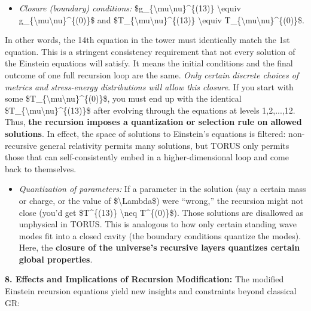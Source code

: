 \documentclass[
]{article}
\begin{document}
\begin{itemize}
\item
  \emph{Closure (boundary) conditions:}
  \$g\_\{\textbackslash mu\textbackslash nu\}\^{}\{(13)\}
  \textbackslash equiv
  g\_\{\textbackslash mu\textbackslash nu\}\^{}\{(0)\}\$ and
  \$T\_\{\textbackslash mu\textbackslash nu\}\^{}\{(13)\}
  \textbackslash equiv
  T\_\{\textbackslash mu\textbackslash nu\}\^{}\{(0)\}\$\hspace{0pt}.
\end{itemize}

In other words, the 14th equation in the tower must identically match
the 1st equation. This is a stringent consistency requirement that not
every solution of the Einstein equations will satisfy. It means the
initial conditions and the final outcome of one full recursion loop are
the same. \emph{Only certain discrete choices of metrics and
stress-energy distributions will allow this closure}. If you start with
some \$T\_\{\textbackslash mu\textbackslash nu\}\^{}\{(0)\}\$, you must
end up with the identical
\$T\_\{\textbackslash mu\textbackslash nu\}\^{}\{(13)\}\$ after evolving
through the equations at levels 1,2,...,12. Thus, \textbf{the recursion
imposes a quantization or selection rule on allowed
solutions}\hspace{0pt}. In effect, the space of solutions to Einstein's
equations is filtered: non-recursive general relativity permits many
solutions, but TORUS only permits those that can self-consistently embed
in a higher-dimensional loop and come back to themselves.

\begin{itemize}
\item
  \emph{Quantization of parameters:} If a parameter in the solution (say
  a certain mass or charge, or the value of \$\textbackslash Lambda\$)
  were ``wrong,'' the recursion might not close (you'd get
  \$T\^{}\{(13)\} \textbackslash neq T\^{}\{(0)\}\$). Those solutions
  are disallowed as unphysical in TORUS. This is analogous to how only
  certain standing wave modes fit into a closed cavity (the boundary
  conditions quantize the modes). Here, the \textbf{closure of the
  universe's recursive layers quantizes certain global properties}.
\end{itemize}

\textbf{8. Effects and Implications of Recursion Modification:} The
modified Einstein recursion equations yield new insights and constraints
beyond classical GR:
\end{document}
